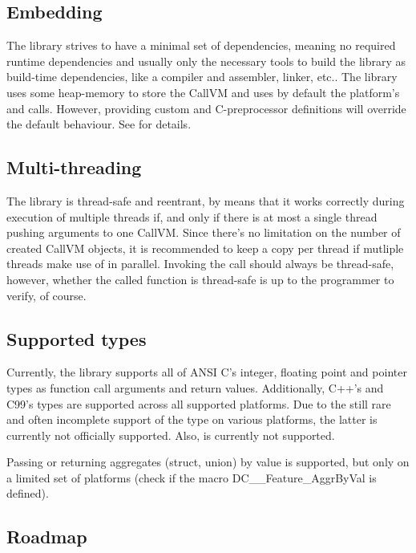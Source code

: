 \subsection{Embedding}

The  library strives to have a minimal set of dependencies,
meaning no required runtime dependencies and usually only the necessary tools
to build the library as build-time dependencies, like a compiler and assembler,
linker, etc..
The library uses some heap-memory to store the CallVM and uses by default the
platform's  and  calls. However, providing custom
 and  C-preprocessor definitions will override
the default behaviour.
See  for details.


\subsection{Multi-threading}

The  library is thread-safe and reentrant, by means that it
works correctly during execution of multiple threads if, and only if there is
at most a single thread pushing arguments to one CallVM. Since there's no
limitation on the number of created CallVM objects, it is recommended to keep a
copy per thread if mutliple threads make use of  in parallel.
Invoking the call should always be thread-safe, however, whether the called
function is thread-safe is up to the programmer to verify, of course.

\subsection{Supported types}

Currently, the  library supports all of ANSI C's integer,
floating point and pointer types as function call arguments and return values.
Additionally, C++'s  and C99's  types are supported
across all supported platforms.
Due to the still rare and often incomplete support of the 
type on various platforms, the latter is currently not officially supported.
Also,  is currently not supported.

Passing or returning aggregates (struct, union) by value is supported, but only
on a limited set of platforms (check if the macro DC\_\_Feature\_AggrByVal is
defined).

\subsection{Roadmap}

